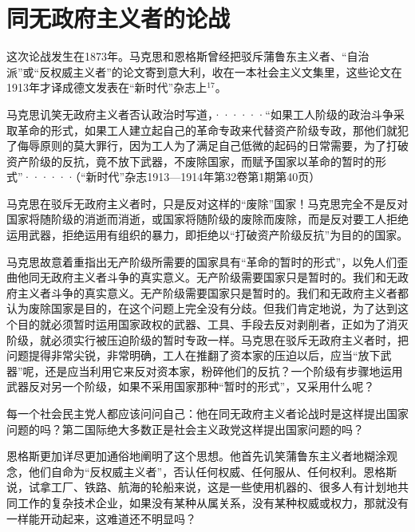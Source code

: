 \chapter{同无政府主义者的论战} %

这次论战发生在1873年。马克思和恩格斯曾经把驳斥蒲鲁东主义者、“自治派”或“反权威主义者”的论文寄到意大利，收在一本社会主义文集里，这些论文在1913年才译成德文发表在“新时代”杂志上$^{17}$。

\pskip
\leftskip=10mm
\small

马克思讥笑无政府主义者否认政治时写道，······“如果工人阶级的政治斗争采取革命的形式，如果工人建立起自己的革命专政来代替资产阶级专政，那他们就犯了侮辱原则的莫大罪行，因为工人为了满足自己低微的起码的日常需要，为了打破资产阶级的反抗，竟不放下武器，不废除国家，而赋予国家以革命的暂时的形式”······（“新时代”杂志1913—1914年第32卷第1期第40页）

\normalsize
\leftskip=0mm
\pskip

马克思在驳斥无政府主义者时，只是反对这样的“废除”国家！马克思完全不是反对国家将随阶级的消逝而消逝，或国家将随阶级的废除而废除，而是反对要工人拒绝运用武器，拒绝运用有组织的暴力，{\kaishu 即拒绝}以“打破资产阶级反抗”为目的的{\kaishu 国家}。

马克思故意着重指出无产阶级所需要的国家具有“革命的{\kaishu 暂时的}形式”，以免人们歪曲他同无政府主义者斗争的真实意义。无产阶级需要国家只是暂时的。我们和无政府主义者斗争的真实意义。无产阶级需要国家只是暂时的。我们和无政府主义者都认为废除国家是{\kaishu 目的}，在这个问题上完全没有分歧。但我们肯定地说，为了达到这个目的就必须暂时运用国家政权的武器、工具、手段去{\kaishu 反对}剥削者，正如为了消灭阶级，就必须实行被压迫阶级的暂时专政一样。马克思在驳斥无政府主义者时，把问题提得非常尖锐，非常明确，工人在推翻了资本家的压迫以后，应当“放下武器”呢，还是应当利用它来反对资本家，粉碎他们的反抗？一个阶级有步骤地运用武器反对另一个阶级，如果不采用国家那种“暂时的形式”，又采用什么呢？

每一个社会民主党人都应该问问自己：他在同无政府主义者论战时是{\kaishu 这样}提出国家问题的吗？第二国际绝大多数正是社会主义政党{\kaishu 这样}提出国家问题的吗？

恩格斯更加详尽更加通俗地阐明了这个思想。他首先讥笑蒲鲁东主义者地糊涂观念，他们自命为“反权威主义者”，否认任何权威、任何服从、任何权利。恩格斯说，试拿工厂、铁路、航海的轮船来说，这是一些使用机器的、很多人有计划地共同工作的复杂技术企业，如果没有某种从属关系，没有某种权威或权力，那就没有一样能开动起来，这难道还不明显吗？

